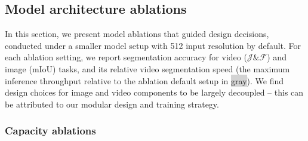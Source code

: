 \documentclass[]{fairmeta}
\newcommand{\mjf}{$\mathcal{J}\&\mathcal{F}$\xspace}
\begin{document}
\begin{table}[ht]
    \vspace{5pt}
    
    \vspace{-5pt}
    \caption{
    We train our model on different subsets of our SA-V Manual data: 50k randomly sampled masklets, 50k masklets with the most edited frames, and the full SA-V dataset (190k masklets).
    }
    \label{tab:data-quality}
\end{table}




\subsection{Model architecture ablations}

In this section, we present model ablations that guided design decisions, conducted under a smaller model setup with 512 input resolution by default. For each ablation setting, we report segmentation accuracy for video (\mjf) and image (mIoU) tasks, and its relative video segmentation speed (the maximum inference throughput relative to the ablation default setup in \colorbox{lightgray}{gray}). 
We find design choices for image and video components to be largely decoupled -- this can be attributed to our modular design and training strategy. 

\subsubsection{Capacity ablations}
\end{document}
